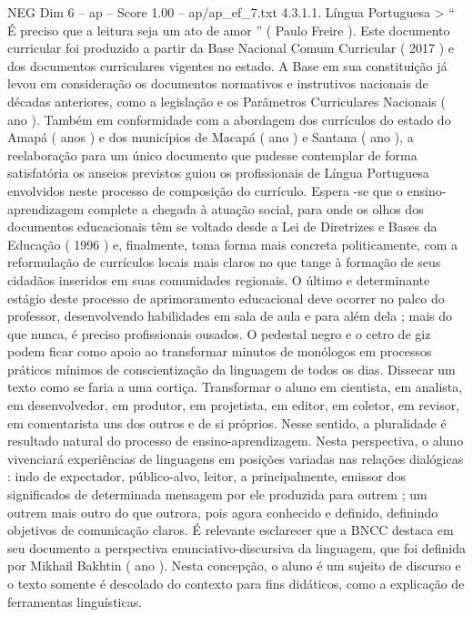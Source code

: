 \begin{textsample}{NEG Dim 6 – ap – Score 1.00 – ap/ap\_ef\_7.txt}  \label{ex:f6_neg_187}
4.3.1.1.
Língua Portuguesa > “ É preciso que a leitura seja um ato de amor ” ( Paulo Freire ).
Este documento curricular foi produzido a partir da Base Nacional Comum Curricular ( 2017 ) e dos documentos curriculares vigentes no estado.
A Base em sua constituição já levou em consideração os documentos normativos e instrutivos nacionais de décadas anteriores, como a legislação e os Parâmetros Curriculares Nacionais ( ano ).
Também em conformidade com a abordagem dos currículos do estado do Amapá ( anos ) e dos municípios de Macapá ( ano ) e Santana ( ano ), a reelaboração para um único documento que pudesse contemplar de forma satisfatória os anseios previstos guiou os profissionais de Língua Portuguesa envolvidos neste processo de composição do currículo.
Espera -se que o ensino-aprendizagem complete a chegada à atuação social, para onde os olhos dos documentos educacionais têm se voltado desde a Lei de Diretrizes e Bases da Educação ( 1996 ) e, finalmente, toma forma mais concreta politicamente, com a reformulação de currículos locais mais claros no que tange à formação de seus cidadãos inseridos em suas comunidades regionais.
O último e determinante estágio deste processo de aprimoramento educacional deve ocorrer no palco do professor, desenvolvendo habilidades em sala de aula e para além dela ; mais do que nunca, é preciso profissionais ousados.
O pedestal negro e o cetro de giz podem ficar como apoio ao transformar minutos de monólogos em processos práticos mínimos de conscientização da linguagem de todos os dias.
Dissecar um texto como se faria a uma cortiça.
Transformar o aluno em cientista, em analista, em desenvolvedor, em produtor, em projetista, em editor, em coletor, em revisor, em comentarista uns dos outros e de si próprios.
Nesse sentido, a pluralidade é resultado natural do processo de ensino-aprendizagem.
Nesta perspectiva, o aluno vivenciará experiências de linguagens em posições variadas nas relações dialógicas : indo de expectador, público-alvo, leitor, a principalmente, emissor dos significados de determinada mensagem por ele produzida para outrem ; um outrem mais outro do que outrora, pois agora conhecido e definido, definindo objetivos de comunicação claros.
É relevante esclarecer que a BNCC destaca em seu documento a perspectiva enunciativo-discursiva da linguagem, que foi definida por Mikhail Bakhtin ( ano ).
Nesta concepção, o aluno é um sujeito de discurso e o texto somente é descolado do contexto para fins didáticos, como a explicação de ferramentas linguísticas.

\end{textsample}
